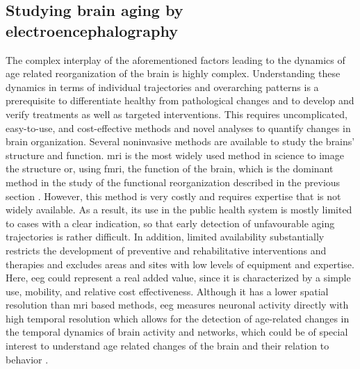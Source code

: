 \subsection{Studying brain aging by electroencephalography}
The complex interplay of the aforementioned factors leading to the dynamics of age related reorganization of the brain is highly complex. Understanding these dynamics in terms of individual trajectories and overarching patterns is a prerequisite to differentiate healthy from pathological changes and to develop and verify treatments as well as targeted interventions. This requires uncomplicated, easy-to-use, and cost-effective methods and novel analyses to quantify changes in brain organization. Several noninvasive methods are available to study the brains' structure and function. \Gls{mri} is the most widely used method in science to image the structure or, using \gls{fmri}, the function of the brain, which is the dominant method in the study of the functional reorganization described in the previous section \cite{Reuter-Lorenz2010}. However, this method is very costly and requires expertise that is not widely available. As a result, its use in the public health system is mostly limited to cases with a clear indication, so that early detection of unfavourable aging trajectories is rather difficult. In addition, limited availability substantially restricts the development of preventive and rehabilitative interventions and therapies and excludes areas and sites with low levels of equipment and expertise. Here, \gls{eeg} could represent a real added value, since it is characterized by a simple use, mobility, and relative cost effectiveness. Although it has a lower spatial resolution than \gls{mri} based methods, \gls{eeg} measures neuronal activity directly with high temporal resolution which allows for the detection of age-related changes in the temporal dynamics of brain activity and networks, which could be of special interest to understand age related changes of the brain and their relation to behavior \cite{Courtney2021}.

